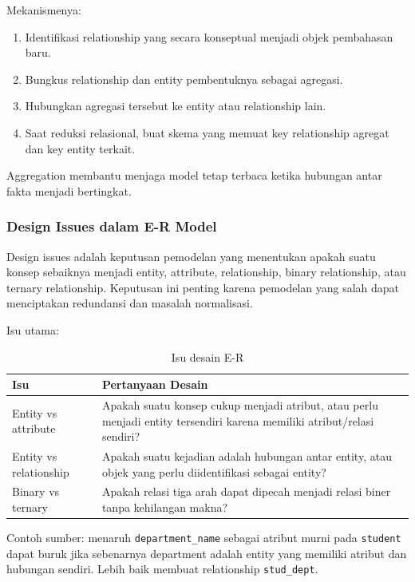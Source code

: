Mekanismenya:
\begin{enumerate}
    \item Identifikasi relationship yang secara konseptual menjadi objek pembahasan baru.
    \item Bungkus relationship dan entity pembentuknya sebagai agregasi.
    \item Hubungkan agregasi tersebut ke entity atau relationship lain.
    \item Saat reduksi relasional, buat skema yang memuat key relationship agregat dan key entity terkait.
\end{enumerate}

Aggregation membantu menjaga model tetap terbaca ketika hubungan antar fakta menjadi bertingkat.

\subsubsection{Design Issues dalam E-R Model}

\begin{jawab}
Design issues adalah keputusan pemodelan yang menentukan apakah suatu konsep sebaiknya menjadi entity, attribute, relationship, binary relationship, atau ternary relationship. Keputusan ini penting karena pemodelan yang salah dapat menciptakan redundansi dan masalah normalisasi.
\end{jawab}

Isu utama:
\begin{table}[H]
\centering
\begin{tabularx}{\textwidth}{|L{0.26\textwidth}|X|}
\hline
\textbf{Isu} & \textbf{Pertanyaan Desain} \\
\hline
Entity vs attribute & Apakah suatu konsep cukup menjadi atribut, atau perlu menjadi entity tersendiri karena memiliki atribut/relasi sendiri? \\
\hline
Entity vs relationship & Apakah suatu kejadian adalah hubungan antar entity, atau objek yang perlu diidentifikasi sebagai entity? \\
\hline
Binary vs ternary & Apakah relasi tiga arah dapat dipecah menjadi relasi biner tanpa kehilangan makna? \\
\hline
\end{tabularx}
\caption{Isu desain E-R}
\label{tab:er-design-issues}
\end{table}

Contoh sumber: menaruh \texttt{department\_name} sebagai atribut murni pada \texttt{student} dapat buruk jika sebenarnya department adalah entity yang memiliki atribut dan hubungan sendiri. Lebih baik membuat relationship \texttt{stud\_dept}.

